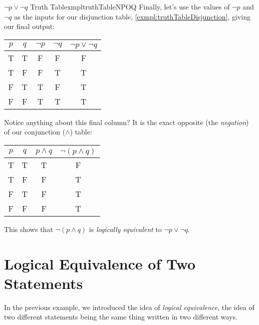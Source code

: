 \begin{exmpl}[label={exmpl:truthTableNPOQ}]{$\lnot p \lor \lnot q$ Truth Table}{xmpltruthTableNPOQ}
    Finally, let's use the values of $\lnot p$ and $\lnot q$ as the inputs for our disjunction table, \cref{exmpl:truthTableDisjunction}, giving our final output:

    \begin{center}
        \begin{tabular}{|c|c|c|c|c|}
            \hline
            $p$ & $q$ & $\lnot p$ & $\lnot q$ & $\lnot p \lor \lnot q$ \\
            \hline
            T   & T   & F         & F         & F                      \\
            \hline
            T   & F   & F         & T         & T                      \\
            \hline
            F   & T   & T         & F         & T                      \\
            \hline
            F   & F   & T         & T         & T                      \\
            \hline
        \end{tabular}
    \end{center}
    \vspace{0.5cm}

    Notice anything about this final column? It is the exact opposite (the \emph{negation}) of our conjunction ($\land$) table:
    \begin{center}
        \begin{tabular}{|c|c|c|c|}
            \hline
            $p$ & $q$ & $p \land q$ & $\lnot(p \land q)$ \\
            \hline
            T   & T   & T           & F                  \\
            \hline
            T   & F   & F           & T                  \\
            \hline
            F   & T   & F           & T                  \\
            \hline
            F   & F   & F           & T                  \\
            \hline
        \end{tabular}
    \end{center}
    \vspace{0.5cm}
    This shows that $\lnot (p \land q)$ is \emph{logically equivalent} to $\lnot p \lor \lnot q$.
\end{exmpl}

\section{Logical Equivalence of Two Statements}
In the previous example, we introduced the idea of \emph{logical equivalence}, the idea of two different statements being the same thing written in two different ways.

